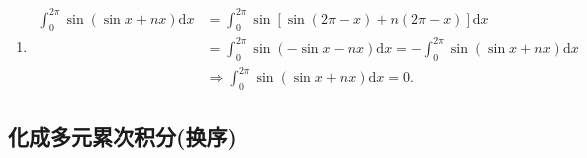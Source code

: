\documentclass[../../main.tex]{subfiles}
\begin{document}
\begin{solution}
\begin{enumerate}
\item\begin{align*}
\int_0^{2\pi}{\sin \left( \sin x+nx \right) \mathrm{d}x}&=\int_0^{2\pi}{\sin \left[ \sin \left( 2\pi -x \right) +n\left( 2\pi -x \right) \right] \mathrm{d}x}
\\
&=\int_0^{2\pi}{\sin \left( -\sin x-nx \right) \mathrm{d}x}=-\int_0^{2\pi}{\sin \left( \sin x+nx \right) \mathrm{d}x}
\\
&\Longrightarrow \int_0^{2\pi}{\sin \left( \sin x+nx \right) \mathrm{d}x}=0.
\end{align*} 
\end{enumerate}
\end{solution}



\subsection{化成多元累次积分(换序)}
\end{document}
